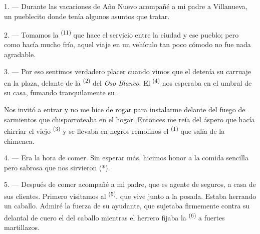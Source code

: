 

\VUsaut{4.0mm}
\VUsaut{3.0mm}
\VUfilet{16mm}
\VUsaut{5.6mm}
\VUsaut{3.0mm}

\VUsaut{3.0mm}

\VUsaut{4.0mm}

1. --- Durante las vacaciones de Año Nuevo acompañé a mi padre a
Villanueva, un pueblecito donde tenía algunos asuntos que tratar.

2. --- Tomamos la  \textsuperscript{(11)} que hace el servicio
entre la ciudad y ese pueblo; pero como hacía mucho frío, aquel viaje en
un vehículo tan poco cómodo no fue nada agradable.

3. --- Por eso sentimos verdadero placer cuando vimos que el
 detenía su carruaje en la plaza, delante de la
 \textsuperscript{(2)} del \textit{Oso Blanco}. El 
\textsuperscript{(4)} nos esperaba en el umbral de su casa, fumando tranquilamente
su .

Nos invitó a entrar y no me hice de rogar para instalarme delante del
fuego de sarmientos que chisporroteaba en el hogar. Entonces me reía del
áspero  que hacía chirriar el viejo 
\textsuperscript{(3)} y se llevaba en negros remolinos el 
\textsuperscript{(1)} que salía de la chimenea.

4. --- Era la hora de comer. Sin esperar más, hicimos honor a la comida
sencilla pero sabrosa que nos sirvieron (*).

\VUsaut{3.0mm}

5. --- Después de comer acompañé a mi padre, que es agente de seguros, a
casa de sus clientes. Primero visitamos al  \textsuperscript{(5)},
que vive junto a la posada. Estaba herrando un caballo. Admiré la fuerza
de su ayudante, que sujetaba firmemente contra su delantal de cuero el
 del caballo mientras el herrero fijaba la 
\textsuperscript{(6)} a fuertes martillazos.

